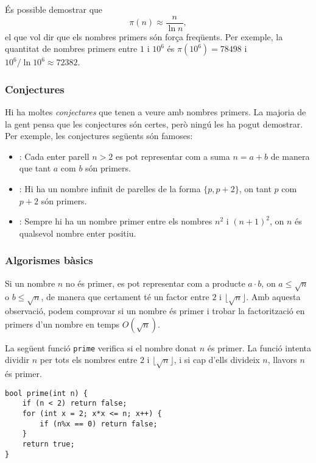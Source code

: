 És possible demostrar que
\[\pi(n) \approx \frac{n}{\ln n},\]
el que vol dir que els nombres primers són força freqüents. Per
exemple, la quantitat de nombres primers entre $1$ i $10^6$ és
$\pi(10^6)=78498$ i $10^6 / \ln 10^6 \approx 72382$.

\subsubsection{Conjectures}

Hi ha moltes \emph{conjectures} que tenen a veure amb nombres
primers. La majoria de la gent pensa que les conjectures són certes,
però ningú les ha pogut demostrar. Per exemple, les conjectures
següents són famoses:


\begin{itemize}
\item {}:
Cada enter parell $n>2$ es pot representar com a
suma $n=a+b$ de manera que tant $a$ com $b$ són primers.
\item {}:
Hi ha un nombre infinit de parelles
de la forma $\{p,p+2\}$,
on tant $p$ com $p+2$ són primers.
\item {}:
Sempre hi ha un nombre primer entre els nombres
$n^2$ i $(n+1)^2$, on $n$ és qualsevol nombre enter positiu.
\end{itemize}


\subsubsection{Algorismes bàsics}

Si un nombre $n$ no és primer, es pot representar com a producte $a
\cdot b$, on $a \le \sqrt n$ o $b \le \sqrt n$, de manera que
certament té un factor entre $2$ i $\lfloor \sqrt n \rfloor$. Amb
aquesta observació, podem comprovar si un nombre és primer i trobar la
factorització en primers d'un nombre en temps $O(\sqrt n)$.

La següent funció \texttt{prime} verifica si el nombre donat $n$ és
primer. La funció intenta dividir $n$ per tots els nombres entre $2$ i
$\lfloor \sqrt n \rfloor$, i si cap d'ells divideix $n$, llavors $n$
és primer.


\begin{lstlisting}
bool prime(int n) {
    if (n < 2) return false;
    for (int x = 2; x*x <= n; x++) {
        if (n%x == 0) return false;
    }
    return true;
}
\end{lstlisting}


